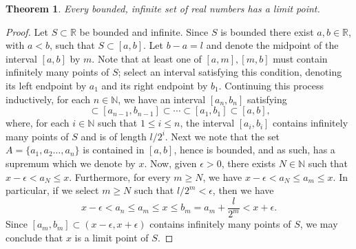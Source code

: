 \documentclass[12pt]{article}
\theoremstyle{plain}
\newtheorem*{thm}{Theorem}
\begin{document}
\begin{thm}
Every bounded, infinite set of real numbers has a limit point. 
\end{thm}
\begin{proof}
Let $S\subset\mathbb{R}$ be bounded and infinite. Since $S$ is bounded there exist $a,b\in\mathbb{R}$, with $a<b$, such that $S\subset[a,b]$. Let $b-a=l$ and denote the midpoint of the interval $[a,b]$ by $m$. Note that at least one of $[a,m],[m,b]$ must contain infinitely many points of $S$; select an interval satisfying this condition, denoting its left endpoint by $a_1$ and its right endpoint by $b_1$. Continuing this process inductively, for each $n\in\mathbb{N}$, we have an interval $[a_n,b_n]$ satisfying 
\begin{equation}
[a_n,b_n]\subset[a_{n-1},b_{n-1}]\subset\cdots\subset[a_1,b_1]\subset[a,b]\text{,}
\end{equation}
where, for each $i\in\mathbb{N}$ such that $1\leq i\leq n$, the interval $[a_i,b_i]$ contains infinitely many points of $S$ and is of length $l/2^i$. Next we note that the set $A=\{a_1,a_2\ldots,a_n\}$ is contained in $[a,b]$, hence is bounded, and as such, has a supremum which we denote by $x$. Now, given $\epsilon>0$, there exists $N\in\mathbb{N}$ such that $x-\epsilon<a_N\leq x$. Furthermore, for every $m\geq N$, we have $x-\epsilon<a_N\leq a_m\leq x$. In particular, if we select $m\geq N$ such that $l/2^m<\epsilon$, then we have
\begin{equation}
x-\epsilon<a_n\leq a_m\leq x\leq b_m=a_m+\dfrac{l}{2^m}<x+\epsilon\text{.}
\end{equation}
Since $[a_m,b_m]\subset(x-\epsilon,x+\epsilon)$ contains infinitely many points of $S$, we may conclude that $x$ is a limit point of $S$. 
\end{proof}
\end{document}
